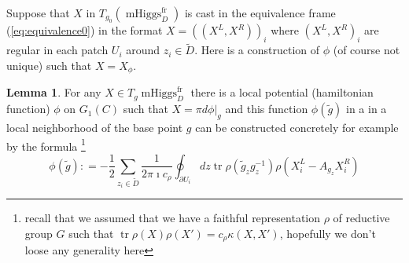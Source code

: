 \documentclass[11pt, oneside, reqno]{amsart}
\theoremstyle{definition} \newtheorem{definition}{Definition}[section]
\newtheorem{lemma}[definition]{Lemma}
\theoremstyle{definition} \newtheorem{remark}[definition]{Remark}
\theoremstyle{definition} \newtheorem{remarks}[definition]{Remarks}
\theoremstyle{definition} \newtheorem{question}[definition]{Question}
\theoremstyle{definition} \newtheorem*{note}{Note}
\theoremstyle{definition} \newtheorem{example}[definition]{Example}
\theoremstyle{definition} \newtheorem{examples}[definition]{Examples}
\DeclareMathOperator{\tr}{tr}
\DeclareMathOperator{\mhiggs}{mHiggs}
\newcommand{\fr}{\mathrm{fr}}
\begin{document}
Suppose that $X$ in $T_{g_0}( \mhiggs_{D}^{\fr}) $ is cast in the equivalence frame (\ref{eq:equivalence0}) in the format $X = ((X^{L}, X^{R}))_{i}$ where $(X^{L}, X^{R})_{i}$ are regular
in each patch $U_i$ around $z_i \in \tilde D$. Here is a construction of $\phi$ (of course not unique) such that $X = X_{\phi}$.


\begin{lemma}\label{xtophi}
  For any $X \in T_{g} \mhiggs^{\fr}_{D}$ there is a local potential (hamiltonian function)
  $\phi$ on $G_1(C)$ such that $X = \pi d \phi|_{g} $ and this function $\phi(\tilde g)$
  in a in a local neighborhood of the base point $g$
  can be constructed 
  concretely for example by the formula \footnote{recall
  that we assumed that we have a faithful representation $\rho$
  of reductive group  $G$ such that $\tr\rho(X) \rho(X') = c_\rho \kappa(X, X')$, hopefully
we don't loose any generality here}
\begin{equation}
  \phi(\tilde g) : = -\frac 1 2 \sum_{z_i \in \tilde D} \frac{1}{2 \pi \imath c_\rho} \oint_{\partial U_{i}} 
dz  \tr \rho( \tilde g_z  g_z^{-1}) \rho(X^{L}_i - A_{ g_z} X_{i}^{R}) 
\end{equation}
\end{lemma}
  
\end{document}
